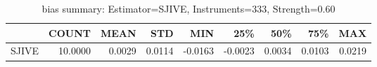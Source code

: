 \begin{table}[ht]
\centering
\caption{bias summary: Estimator=SJIVE, Instruments=333, Strength=0.60}
\begin{tabular}{lrrrrrrrr}
\toprule
 & COUNT & MEAN & STD & MIN & 25\% & 50\% & 75\% & MAX \\
\midrule
SJIVE & 10.0000 & 0.0029 & 0.0114 & -0.0163 & -0.0023 & 0.0034 & 0.0103 & 0.0219 \\
\bottomrule
\end{tabular}
\end{table}
